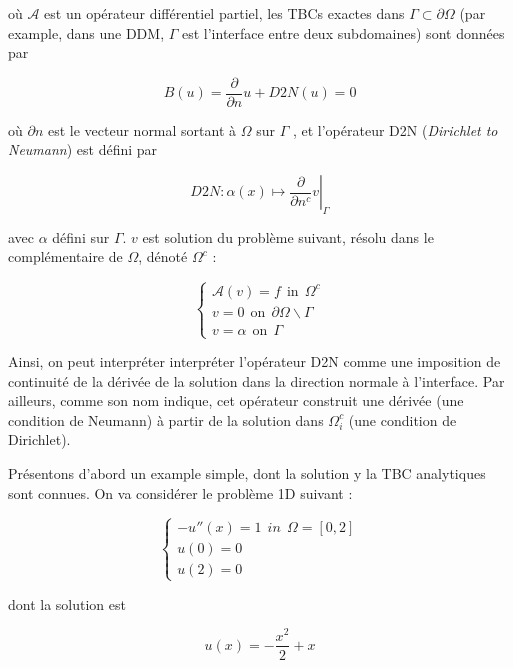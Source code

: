 \noindent où $\mathcal{A}$ est un opérateur différentiel partiel, les TBCs exactes dans $\Gamma \subset \partial\Omega$ (par example, dans une DDM, $\Gamma$ est l'interface entre deux subdomaines) sont données par \cite{Japhet2003}

\begin{equation}
\label{eq:exactTBC}
B(u) = \frac{\partial}{\partial n}u + D2N(u) = 0
\end{equation}

\noindent où $\partial n$ est le vecteur normal sortant à $\Omega$ sur $\Gamma$ , et l'opérateur D2N (\emph{Dirichlet to Neumann}) est défini par

$$\left. D2N : \alpha(x) \mapsto \frac{\partial}{\partial n^c}v \right\rvert_{\Gamma}$$

\noindent avec $\alpha$ défini sur $\Gamma$. $v$ est solution du problème suivant, résolu dans le complémentaire de $\Omega$, dénoté $\Omega^c$ : 

\begin{equation*}
\begin{cases}
\mathcal{A}(v) = f \ \ \text{in} \ \ \Omega^c\\
v = 0 \ \ \text{on} \ \ \partial \Omega \backslash \Gamma \\
v = \alpha \ \ \text{on} \ \ \Gamma
\end{cases}
\end{equation*}

\indent Ainsi, on peut interpréter interpréter l'opérateur D2N comme une imposition de continuité de la dérivée de la solution dans la direction normale à l'interface. Par ailleurs, comme son nom indique, cet opérateur construit une dérivée (une condition de Neumann) à partir de la solution dans $\Omega_i^c$ (une condition de Dirichlet).



\indent Présentons d'abord un example simple, dont la solution y la TBC analytiques sont connues. On va considérer le problème 1D suivant :

\begin{equation*}
\begin{cases}
-u''(x) = 1 \ \ in \ \ \Omega = [0,2]\\
u(0) = 0 \\
u(2) = 0
\end{cases}
\end{equation*}

\noindent dont la solution est

$$u(x) = -\frac{x^2}{2} + x$$

